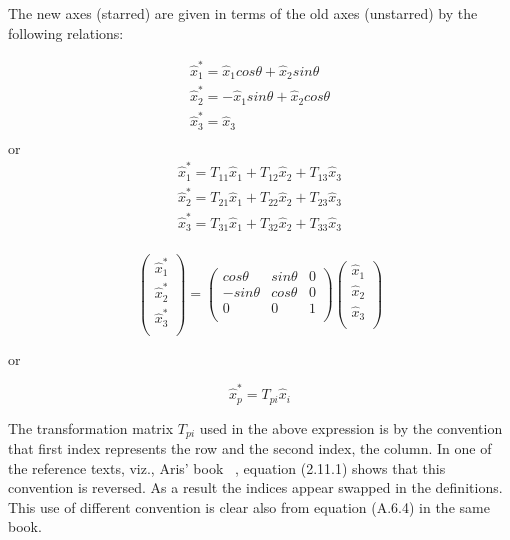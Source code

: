 The new axes (starred) are given in terms of the old axes (unstarred) by the following relations:

\begin{equation}
\begin{array}{l}
\hat{x}_1^* =  \hat{x}_1 cos\theta + \hat{x}_2 sin\theta \\
\hat{x}_2^* =  -\hat{x}_1 sin\theta + \hat{x}_2 cos\theta \\
\hat{x}_3^* =  \hat{x}_3 \\
\end{array}
\end{equation}
or
\begin{equation}
\label{oldnew}
\begin{array}{l}
\hat{x}_1^* = T_{11}\hat{x}_1 + T_{12}\hat{x}_2 + T_{13}\hat{x}_3\\
\hat{x}_2^* = T_{21}\hat{x}_1 + T_{22}\hat{x}_2 + T_{23}\hat{x}_3\\
\hat{x}_3^* = T_{31}\hat{x}_1 + T_{32}\hat{x}_2 + T_{33}\hat{x}_3\\
\end{array}
\end{equation}

\begin{equation}
\left( 
\begin{array}{l}
\hat{x}_1^*  \\
\hat{x}_2^* \\
\hat{x}_3^*  \\
\end{array}
\right) 
= \left( 
\begin{array}{lll}
 cos\theta  &  sin\theta  & 0\\
 -sin\theta &  cos\theta  & 0 \\
  0 & 0 & 1\\
\end{array}
\right) 
\left( 
\begin{array}{l}
\hat{x}_1 \\
\hat{x}_2 \\
\hat{x}_3 \\
\end{array}
\right)
\end{equation}

or

\begin{equation}
\label{vecdeff}
\boxed{
\hat{x}_p^* = T_{pi}\hat{x}_i
}
\end{equation} 

The transformation matrix  $T_{pi}$ used in the above expression is by the convention that first index represents the row and the second index, the column. In one of the reference texts, viz., Aris' book ~\cite{aris}, equation (2.11.1) shows that this convention is reversed. As a result the indices appear swapped in the definitions. This use of different convention is clear also from equation (A.6.4) in the same book.

